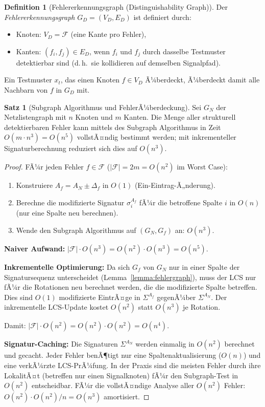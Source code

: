 ﻿\documentclass[a4paper,12pt]{article}
\theoremstyle{definition}
\newtheorem{definition}{Definition}
\newtheorem{satz}{Satz}
\begin{document}
\begin{definition}[Fehlererkennungsgraph (Distinguishability Graph)]\label{def:fdgraph}
  Der \emph{Fehlererkennungsgraph} $G_D = (V_D, E_D)$ ist definiert durch:
  \begin{itemize}
    \item Knoten: $V_D = \mathcal{F}$ (eine Kante pro Fehler),
    \item Kanten: $(f_i, f_j) \in E_D$, wenn $f_i$ und $f_j$ durch dasselbe Testmuster
          detektierbar sind (d.\,h.\ sie kollidieren auf demselben Signalpfad).
  \end{itemize}
  Ein Testmuster $x_t$, das einen Knoten $f \in V_D$ Ã¼berdeckt, Ã¼berdeckt damit alle
  Nachbarn von $f$ in $G_D$ mit.
\end{definition}

\begin{satz}[Subgraph Algorithmus und FehlerÃ¼berdeckung]\label{satz:atpg_subgraph}
  Sei $G_N$ der Netzlistengraph mit $n$ Knoten und $m$ Kanten. Die Menge aller
  strukturell detektierbaren Fehler kann mittels des Subgraph Algorithmus in Zeit
  $O(m \cdot n^3) = O(n^5)$ vollstÃ¤ndig bestimmt werden; mit inkrementeller
  Signaturberechnung reduziert sich dies auf $O(n^3)$.
\end{satz}

\begin{proof}
  FÃ¼r jeden Fehler $f \in \mathcal{F}$ ($|\mathcal{F}| = 2m = O(n^2)$ im Worst Case):
  \begin{enumerate}
    \item Konstruiere $A_f = A_N \pm \Delta_f$ in $O(1)$ (Ein-Eintrag-Ã„nderung).
    \item Berechne die modifizierte Signatur $\sigma_i^{A_f}$ fÃ¼r die betroffene
          Spalte $i$ in $O(n)$ (nur eine Spalte neu berechnen).
    \item Wende den Subgraph Algorithmus auf $(G_N, G_f)$ an: $O(n^3)$.
  \end{enumerate}

  \textbf{Naiver Aufwand:} $|\mathcal{F}| \cdot O(n^3) = O(n^2) \cdot O(n^3) = O(n^5)$.

  \textbf{Inkrementelle Optimierung:} Da sich $G_f$ von $G_N$ nur in einer Spalte der
  Signatursequenz unterscheidet (Lemma~\ref{lemma:fehlergraph}), muss der LCS nur fÃ¼r
  die Rotationen neu berechnet werden, die die modifizierte Spalte betreffen. Dies sind
  $O(1)$ modifizierte EintrÃ¤ge in $\Sigma^{A_f}$ gegenÃ¼ber $\Sigma^{A_N}$. Der
  inkrementelle LCS-Update kostet $O(n^2)$ statt $O(n^3)$ je Rotation.

  Damit: $|\mathcal{F}| \cdot O(n^2) = O(n^2) \cdot O(n^2) = O(n^4)$.

  \textbf{Signatur-Caching:} Die Signaturen $\Sigma^{A_N}$ werden einmalig in $O(n^2)$
  berechnet und gecacht. Jeder Fehler benÃ¶tigt nur eine Spaltenaktualisierung ($O(n)$)
  und eine verkÃ¼rzte LCS-PrÃ¼fung. In der Praxis sind die meisten Fehler durch ihre
  LokalitÃ¤t (betreffen nur einen Signalknoten) fÃ¼r den Subgraph-Test in $O(n^2)$
  entscheidbar. FÃ¼r die vollstÃ¤ndige Analyse aller $O(n^2)$ Fehler: $O(n^2) \cdot O(n^2)
  / n = O(n^3)$ amortisiert.
\end{proof}
\end{document}
